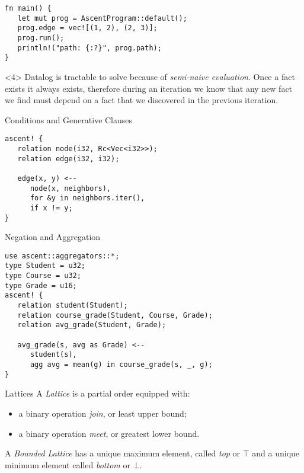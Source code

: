 \documentclass[presentation]{beamer}
\begin{document}
\begin{frame}
\begin{onlyenv}
\begin{verbatim}
fn main() {
   let mut prog = AscentProgram::default();
   prog.edge = vec![(1, 2), (2, 3)];
   prog.run();
   println!("path: {:?}", prog.path);
}
\end{verbatim}
\end{onlyenv}
\begin{onlyenv}<4>
Datalog is tractable to solve because of \emph{semi-naive evaluation}. Once a fact exists it always exists, therefore during an iteration we know that any new fact we find must depend on a fact that we discovered in the previous iteration.
\end{onlyenv}
\end{frame}
\begin{frame}[label={sec:orgf0e83be},fragile]{Conditions and Generative Clauses}
 \begin{verbatim}
ascent! {
   relation node(i32, Rc<Vec<i32>>);
   relation edge(i32, i32);

   edge(x, y) <--
      node(x, neighbors),
      for &y in neighbors.iter(),
      if x != y;
}
\end{verbatim}
\end{frame}
\begin{frame}[label={sec:org209f323},fragile]{Negation and Aggregation}
 \begin{verbatim}
use ascent::aggregators::*;
type Student = u32;
type Course = u32;
type Grade = u16;
ascent! {
   relation student(Student);
   relation course_grade(Student, Course, Grade);
   relation avg_grade(Student, Grade);

   avg_grade(s, avg as Grade) <--
      student(s),
      agg avg = mean(g) in course_grade(s, _, g);
}
\end{verbatim}
\end{frame}
\begin{frame}[label={sec:org135b707}]{Lattices}
A \emph{Lattice} is a partial order equipped with:
\begin{itemize}
\item a binary operation \emph{join}, or least upper bound;
\item a binary operation \emph{meet}, or greatest lower bound.
\end{itemize}

A \emph{Bounded Lattice} has a unique maximum element, called \emph{top} or \(\top\) and a unique minimum element called \emph{bottom} or \(\bot\).
\end{frame}
\end{document}
